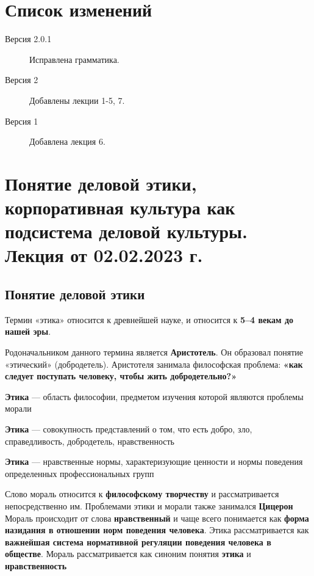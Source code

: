 \section*{Список изменений}
\begin{description}
    \item[Версия 2.0.1] Исправлена грамматика.
    \item[Версия 2] Добавлены лекции 1-5, 7.
    \item[Версия 1] Добавлена лекция 6. 
\end{description}

\clearpage

\tableofcontents
\clearpage

\section{Понятие деловой этики, корпоративная культура как подсистема деловой культуры. Лекция от 02.02.2023 г.}

\subsection{Понятие деловой этики}

Термин «этика» относится к древнейшей науке, и относится к \textbf{5–4 векам до нашей эры}.

Родоначальником данного термина является \textbf{Аристотель}. Он образовал понятие «этический» (добродетель). Аристотеля занимала философская проблема: \textbf{«как следует поступать человеку, чтобы жить добродетельно?»}

\begin{definition}
\textbf{Этика} — область философии, предметом изучения которой являются проблемы морали

\textbf{Этика} — совокупность представлений о том, что есть добро, зло, справедливость, добродетель, нравственность

\textbf{Этика} — нравственные нормы, характеризующие ценности и нормы поведения определенных профессиональных групп
\end{definition}

Слово мораль относится к \textbf{философскому творчеству} и рассматривается непосредственно им. Проблемами этики и морали также занимался \textbf{Цицерон} Мораль происходит от слова \textbf{нравственный} и чаще всего понимается как \textbf{форма назидания в отношении норм поведения человека}. Этика рассматривается как \textbf{важнейшая система нормативной регуляции поведения человека в обществе}. Мораль рассматривается как синоним понятия \textbf{этика} и \textbf{нравственность}

